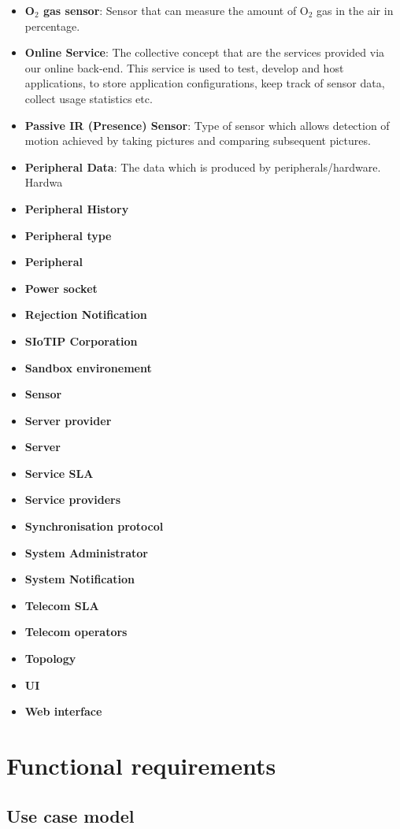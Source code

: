 \documentclass[english,peerreview]{sareport}
\begin{document}
\begin{itemize}
	\item \textbf{O$_2$ gas sensor}: Sensor that can measure the amount of O$_2$ gas in the air  in percentage.
	\item \textbf{Online Service}: The collective concept that are the services provided via our online back-end. This service is used to test, develop and host applications, to store application configurations, keep track of sensor data, collect usage statistics etc. 
	\item \textbf{Passive IR (Presence) Sensor}: Type of sensor which allows detection of motion achieved by taking pictures and comparing subsequent pictures.
	\item \textbf{Peripheral Data}: The data which is produced by peripherals/hardware. Hardwa
	\item \textbf{Peripheral History}
	\item \textbf{Peripheral type}
	\item \textbf{Peripheral}
	\item \textbf{Power socket}
	\item \textbf{Rejection Notification}
	\item \textbf{SIoTIP Corporation}
	\item \textbf{Sandbox environement}
	\item \textbf{Sensor}
	\item \textbf{Server provider}
	\item \textbf{Server}
	\item \textbf{Service SLA}
	\item \textbf{Service providers}
	\item \textbf{Synchronisation protocol}
	\item \textbf{System Administrator}
	\item \textbf{System Notification}
	\item \textbf{Telecom SLA}
	\item \textbf{Telecom operators}
	\item \textbf{Topology}
	\item \textbf{UI}
	\item \textbf{Web interface}
\end{itemize}

\chapter{Functional requirements}\label{sec:functional}
\section*{Use case model}
\end{document}

